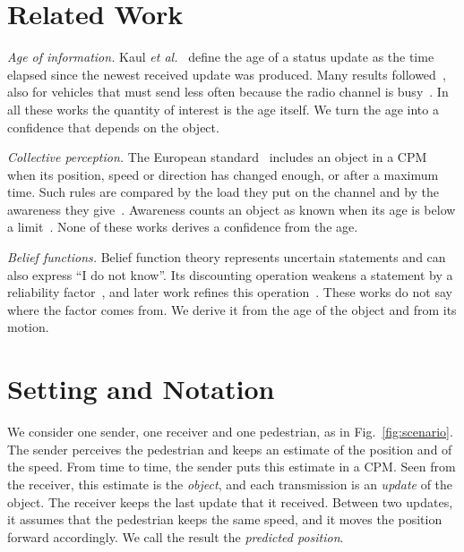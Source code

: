 \documentclass[conference]{IEEEtran}
\begin{document}
\section{Related Work}\label{sec:related}

\emph{Age of information.} Kaul \emph{et al.}~\cite{kaul2012} define the age
of a status update as the time elapsed since the newest received update was
produced. Many results followed~\cite{yates2021}, also for vehicles that must
send less often because the radio channel is busy~\cite{turcanu2021,alsaqabi2026}.
In all these works the quantity of interest is the age itself. We turn the age
into a confidence that depends on the object.

\emph{Collective perception.} The European standard~\cite{ts103324} includes
an object in a CPM when its position, speed or direction has changed enough,
or after a maximum time. Such rules are compared by the load they put on the
channel and by the awareness they give~\cite{tr103562,thandavarayan2020}.
Awareness counts an object as known when its age is below a
limit~\cite{wolff2024}. None of these works derives a confidence from the
age.

\emph{Belief functions.} Belief function theory represents uncertain
statements and can also express ``I do not know''. Its discounting operation
weakens a statement by a reliability factor~\cite{shafer1976}, and later work
refines this operation~\cite{mercier2008}. These
works do not say where the factor comes from. We derive it from the age of the
object and from its motion.

\section{Setting and Notation}\label{sec:model}

We consider one sender, one receiver and one pedestrian, as in
Fig.~\ref{fig:scenario}. The sender perceives the pedestrian and keeps an
estimate of the position and of the speed. From time to time, the sender puts
this estimate in a CPM. Seen from the receiver, this estimate is the
\emph{object}, and each transmission is an \emph{update} of the object. The
receiver keeps the last update that it received. Between two updates, it
assumes that the pedestrian keeps the same speed, and it moves the position
forward accordingly. We call the result the \emph{predicted position}.
\end{document}
